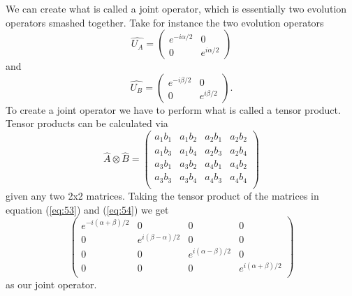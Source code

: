 \documentclass[twocolumn]{article}
\begin{document}
We can create what is called a joint operator, which is essentially two evolution operators smashed together. Take for instance the two evolution operators
\begin{equation} \label{eq:53}
\hat{U_A}=
\begin{pmatrix}
e^{-i\alpha/2} & 0 \\
0 & e^{i\alpha/2}
\end{pmatrix}
\end{equation}
and
\begin{equation} \label{eq:54}
\hat{U_B}=
\begin{pmatrix}
e^{-i\beta/2} & 0 \\
0 & e^{i\beta/2}
\end{pmatrix}.
\end{equation}
To create a joint operator we have to perform what is called a tensor product. Tensor products can be calculated via
\begin{equation} \label{eq:55}
\hat{A}\otimes\hat{B}=
\left(\begin{array}{cccc}
a_1b_1 & a_1b_2 & a_2b_1 & a_2b_2 \\
a_1b_3 & a_1b_4 & a_2b_3 & a_2b_4 \\
a_3b_1 & a_3b_2 & a_4b_1 & a_4b_2 \\
a_3b_3 & a_3b_4 & a_4b_3 & a_4b_4 \\
\end{array}\right)
\end{equation}
given any two 2x2 matrices. Taking the tensor product of the matrices in equation (\ref{eq:53}) and (\ref{eq:54}) we get
\begin{equation} \label{eq:56}
\left(\begin{array}{cccc}
e^{-i(\alpha+\beta)/2} & 0 & 0 & 0 \\
0 & e^{i(\beta-\alpha)/2} & 0 & 0 \\
0 & 0 & e^{i(\alpha-\beta)/2} & 0 \\
0 & 0 & 0 & e^{i(\alpha+\beta)/2} \\
\end{array}\right)
\end{equation}
as our joint operator.
\end{document}

